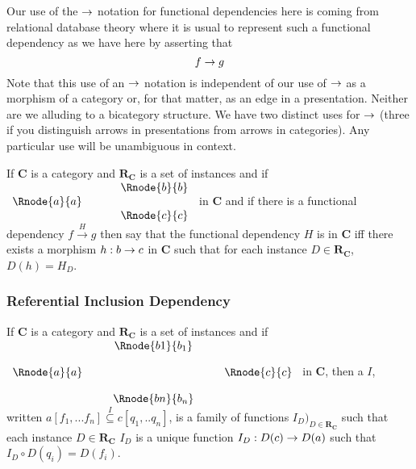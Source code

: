 \documentclass[10pt,a4paper]{article}
\theoremstyle{remark}
\newcommand{\catc}[1][C]{\textbf{#1}}
\newcommand{\reqt}{\textbf{R}}
\newcommand{\reqtc}[1][\catc]{\reqt_{#1}}
\newcommand{\fundep}[3]{#2 \xrightarrow{#1} #3}
\begin{document}
Our use of the $\rightarrow$ notation for functional dependencies here is coming from relational database theory where it is usual to represent such a functional dependency as we have here by asserting that 
$$
f \rightarrow g
$$
Note that this use of an $\rightarrow$ notation is independent of our use of $\rightarrow$ as a morphism of a category 
or, for that matter, as an edge in a presentation. Neither are we alluding to a bicategory structure. We have two distinct uses for $\rightarrow$ (three if you distinguish arrows in presentations from arrows in categories). Any particular use will be unambiguous in context.

\begin{definition}
If $\catc$ is a category and $\reqtc$ is a set of instances and if
$
\begin{array}{c p{0.5cm} c  }
             &&   \Rnode{b}{b} \\[0.01cm]
\Rnode{a}{a} &&                \\[0.01cm] 
             &&   \Rnode{c}{c}         
\end{array} 
$
in $\catc$ 
and if there is a functional dependency $\fundep{H}{f}{g}$ then say that 
the functional dependency $H$ is  in $\catc$ 
iff there exists a morphism $h:b \rightarrow c$ in $\catc$ such that for each instance $D \in \reqtc$, $D(h)=H_D$.
\end{definition}

\subsubsection{Referential Inclusion Dependency}
\begin{definition}
If $\catc$ is a category and $\reqtc$ is a set of instances and if
$
\begin{array}{c p{0.25cm} c  p{0.25cm} c }
             &&   \Rnode{b1}{b_1} &&              \\[0.4cm]
\Rnode{a}{a} &&                   && \Rnode{c}{c} \\[0.4cm]
             &&   \Rnode{bn}{b_n} &&              
\end{array} 
$
in $\catc$, then a  $I$, written $a[f_1,...f_n] \overset{I}{\subseteq} c[q_1,..q_n]$, is a family of functions $I_D)_{D \in \reqtc}$
such that each instance $D \in \reqtc$ $I_D$ is a unique function $I_D : D(c) \rightarrow D(a)$ such that
$I_D \circ D(q_i) = D(f_i)$.
\end{definition}
\end{document}
